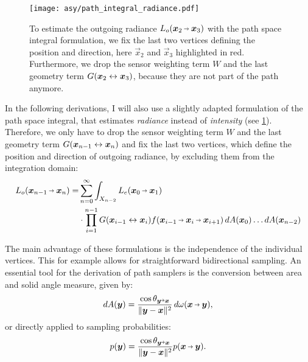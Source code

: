 \begin{figure}[htb!]
    \centering
    \texttt{[image: asy/path\_integral\_radiance.pdf]}
\caption{To estimate the outgoing radiance $L_o(\pdir{2}{3})$ with the path space integral formulation, we fix the last two vertices defining the position and direction, here $\vec{x}_2$ and $\vec{x}_3$ highlighted in red. Furthermore, we drop the sensor weighting term $W$ and the last geometry term $G(\bm{x}_{2} \leftrightarrow \bm{x}_{3})$, because they are not part of the path anymore.}
\label{fig:path_space_integral_radiance}
\end{figure}
In the following derivations, I will also use a slightly adapted formulation of the path space integral, that estimates \emph{radiance} instead of \emph{intensity} (see \cref{fig:path_space_integral_radiance}).
Therefore, we only have to drop the sensor weighting term $W$ and the last geometry term $G(\bm{x}_{n-1} \leftrightarrow \bm{x}_{n})$ and fix the last two vertices, which define the position and direction of outgoing radiance, by excluding them from the integration domain:
\begin{equation}
\label{eq:path_space_integral_radiance}
\begin{aligned}
    L_o(\pdir{n-1}{n})
    = &\sum_{n=0}^{\infty} \int_{X_{n-2}} L_e(\pdir{0}{1}) \\
    &\cdot \prod_{i=1}^{n - 1} \G{i-1}{i} \f{i-1}{i}{i+1} 
    \diff A(\vec{x}_0) \dots \diff A(\vec{x}_{n-2})
\end{aligned}
\end{equation}

The main advantage of these formulations is the independence of the individual vertices.
This for example allows for straightforward bidirectional sampling.
An essential tool for the derivation of path samplers is the conversion between area and solid angle measure, given by:
\begin{equation}
\label{eq:area_solid_angle}
\diff A(\vec{y}) = \frac{\cos \theta_{\vec{y}\veryshortarrow\vec{x}}}{\|\vec{y} - \vec{x}\|^2} \diff \omega(\vec{x}\pto\vec{y}),
\end{equation}
or directly applied to sampling probabilities:
\begin{equation}
\label{eq:area_solid_angle_p}
p(\vec{y}) = \frac{\cos \theta_{\vec{y}\veryshortarrow\vec{x}}}{\|\vec{y} - \vec{x}\|^2} p(\vec{x}\pto\vec{y}).
\end{equation}

